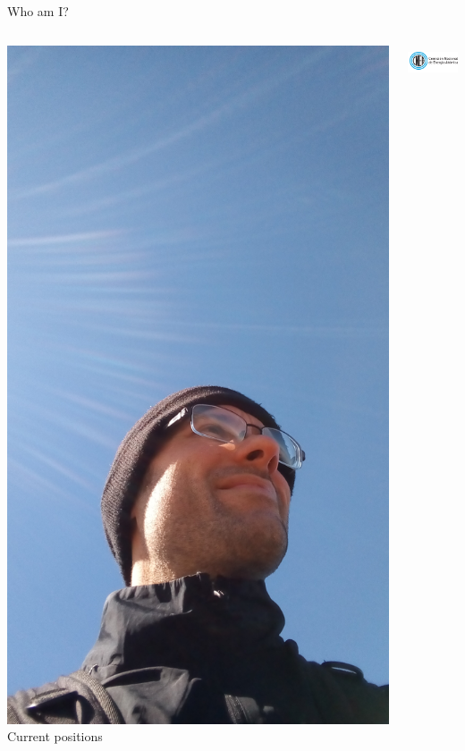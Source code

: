 \begin{frame}{Who am I?}
\begin{columns}
\includegraphics[height=0.8\textheight]{presentation/IMG_20180922_120515771.jpg}
\centering Current positions\par 
  \hspace{1cm}
  \begin{columns}
  \includegraphics[height=1cm]{./presentation/ISOLOGO-CNEA-HORIZONTAL.png}


\end{columns}
\end{columns}
\end{frame}
